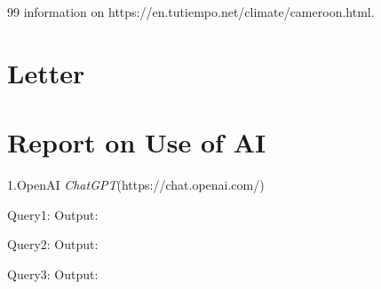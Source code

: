 \documentclass[12pt]{article}
\newcommand\specialsectioning{\setcounter{secnumdepth}{-2}}
\begin{document}
\begin{thebibliography}{99}
     information on https://en.tutiempo.net/climate/cameroon.html.
\end{thebibliography}

\clearpage
\specialsectioning
\section{Letter}

\vspace{2cm}



\clearpage

\label{mainbodyend} %

\newpage
\renewcommand{\sectionmark}[1]{\markright{#1}}
\fancyhead[R]{\rightmark} %
\section{Report on Use of AI}
\noindent
1.OpenAI \textit{ChatGPT}(https://chat.openai.com/) 

\label{1}
Query1:
Output:

\label{2}
Query2: 
Output: 

\label{3}
Query3: 
Output:
\newpage
\end{document}
